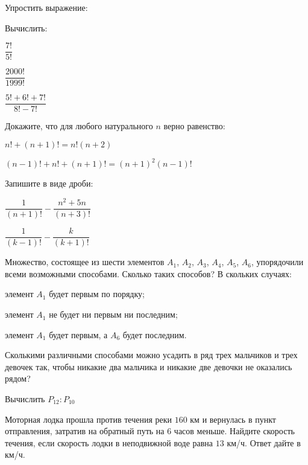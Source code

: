 \begin{listofex}
	\item Упростить выражение:
	\begin{enumcols}[itemcolumns=1]
		\item {}
		\item {}
	\end{enumcols}
	\item Вычислить:
	\begin{enumcols}[itemcolumns=3]
		\item \( \dfrac{7!}{5!} \)
		\item \( \dfrac{2000!}{1999!} \)
		\item \( \dfrac{5!+6!+7!}{8!-7!} \)
	\end{enumcols}
	\item Докажите, что для любого натурального \( n \) верно равенство:
	\begin{enumcols}[itemcolumns=2]
		\item \( n!+(n+1)! = n!(n+2) \)
		\item \( (n-1)!+n!+(n+1)! = (n+1)^2(n-1)! \)
	\end{enumcols}
	\item Запишите в виде дроби:
	\begin{enumcols}[itemcolumns=2]
		\item \( \dfrac{1}{(n+1)!}-\dfrac{n^2+5n}{(n+3)!} \)
		\item \( \dfrac{1}{(k-1)!}-\dfrac{k}{(k+1)!} \)
	\end{enumcols}
	\item Множество, состоящее из шести элементов \( A_1 \), \( A_2 \), \( A_3 \), \( A_4 \), \( A_5 \), \( A_6 \), упорядочили всеми возможными способами. Сколько таких способов? В скольких случаях:
	\begin{enumcols}
		\item элемент \( A_1 \) будет первым по порядку;
		\item элемент \( A_1 \) не будет ни первым ни последним;
		\item элемент \( A_1 \) будет первым, а \( A_6 \) будет последним.
	\end{enumcols}
	\item Сколькими различными способами можно усадить в ряд трех мальчиков и трех девочек так, чтобы никакие два мальчика и никакие две девочки не оказались рядом?
	\item Вычислить \( P_{12}:P_{10} \)
	\item Моторная лодка прошла против течения реки \( 160  \) км и вернулась в пункт отправления, затратив на обратный путь на \( 6  \) часов меньше. Найдите скорость течения, если скорость лодки в неподвижной воде равна \( 13  \) км/ч. Ответ дайте в км/ч.
\end{listofex}
